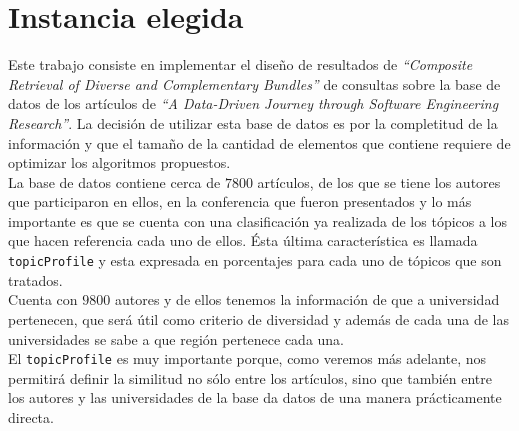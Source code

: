 \section{Instancia elegida}
Este trabajo consiste en implementar el diseño de resultados de \textit{\textquotedblleft Composite Retrieval of Diverse and Complementary Bundles\textquotedblright}\cite{compositeRetrival} de consultas sobre la base de datos de los artículos de \textit{\textquotedblleft A Data-Driven Journey through Software Engineering Research\textquotedblright}\cite{dataDrive}. La decisión de utilizar esta base de datos es por la completitud de la información y que el tamaño de la cantidad de elementos que contiene requiere de optimizar los algoritmos propuestos.\\

La base de datos contiene cerca de $7800$ artículos, de los que se tiene los autores que participaron en ellos, en la conferencia que fueron presentados y lo más importante es que se cuenta con una clasificación ya realizada de los tópicos a los que hacen referencia cada uno de ellos. Ésta última característica es llamada \texttt{topicProfile} y esta expresada en porcentajes para cada uno de tópicos que son tratados.\\

Cuenta con $9800$ autores y de ellos tenemos la información de que a universidad pertenecen, que será útil como criterio de diversidad y además de cada una de las universidades se sabe a que región pertenece cada una.\\

El \texttt{topicProfile} es muy importante porque, como veremos más adelante, nos permitirá definir la similitud no sólo entre los artículos, sino que también entre los autores y las universidades de la base da datos de una manera prácticamente directa.

